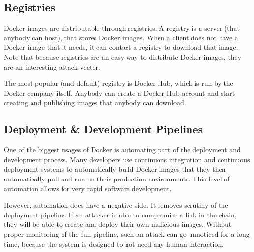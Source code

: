 \subsection{Registries}
Docker images are distributable through registries. A registry is a server (that anybody can host), that stores Docker images. When a client does not have a Docker image that it needs, it can contact a registry to download that image. Note that because registries are an easy way to distribute Docker images, they are an interesting attack vector.

\hfill

The most popular (and default) registry is Docker Hub, which is run by the Docker company itself. Anybody can create a Docker Hub account and start creating and publishing images that anybody can download.

\subsection{Deployment \& Development Pipelines}
One of the biggest usages of Docker is automating part of the deployment and development process. Many developers use continuous integration and continuous deployment systems to automatically build Docker images that they then automatically pull and run on their production environments. This level of automation allows for very rapid software development.

However, automation does have a negative side. It removes scrutiny of the deployment pipeline. If an attacker is able to compromise a link in the chain, they will be able to create and deploy their own malicious images. Without proper monitoring of the full pipeline, such an attack can go unnoticed for a long time, because the system is designed to not need any human interaction.
